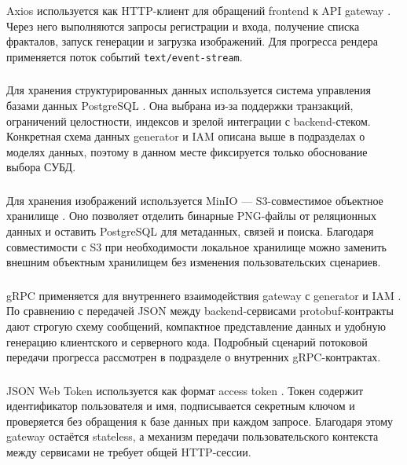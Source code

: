 Axios используется как HTTP-клиент для обращений frontend к API gateway \cite{axios}. Через него выполняются запросы регистрации и входа, получение списка фракталов, запуск генерации и загрузка изображений. Для прогресса рендера применяется поток событий \texttt{text/event-stream}.

\subsubsection{}

Для хранения структурированных данных используется система управления базами данных PostgreSQL \cite{postgresql}. Она выбрана из-за поддержки транзакций, ограничений целостности, индексов и зрелой интеграции с backend-стеком. Конкретная схема данных generator и IAM описана выше в подразделах о моделях данных, поэтому в данном месте фиксируется только обоснование выбора СУБД.

\subsubsection{}

Для хранения изображений используется MinIO --- S3-совместимое объектное хранилище \cite{minio}. Оно позволяет отделить бинарные PNG-файлы от реляционных данных и оставить PostgreSQL для метаданных, связей и поиска. Благодаря совместимости с S3 при необходимости локальное хранилище можно заменить внешним объектным хранилищем без изменения пользовательских сценариев.

\subsubsection{}

gRPC применяется для внутреннего взаимодействия gateway с generator и IAM \cite{grpc}. По сравнению с передачей JSON между backend-сервисами protobuf-контракты дают строгую схему сообщений, компактное представление данных и удобную генерацию клиентского и серверного кода. Подробный сценарий потоковой передачи прогресса рассмотрен в подразделе о внутренних gRPC-контрактах.

\subsubsection{}

JSON Web Token используется как формат access token \cite{jwt_rfc}. Токен содержит идентификатор пользователя и имя, подписывается секретным ключом и проверяется без обращения к базе данных при каждом запросе. Благодаря этому gateway остаётся stateless, а механизм передачи пользовательского контекста между сервисами не требует общей HTTP-сессии.

